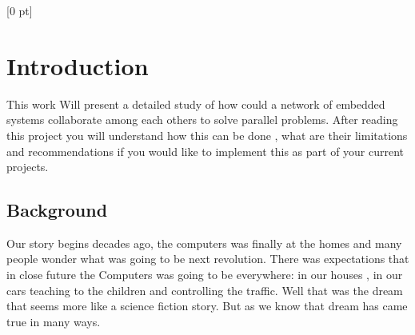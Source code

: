 
\titlespacing{\chapter}{0 pt}{30 pt}{50 pt}[0 pt]
\titleformat{\section}{\Large\bfseries}{\thesection}{0 pt}{\hspace{30 pt}}
\titleformat{\subsection}{\large\bfseries}{\thesubsection}{0 pt}{\hspace{30 pt}}
\pagestyle{fancy}
\fancyhead[LO,LE]{\footnotesize\textit{\leftmark}}
\fancyhead[RO,RE]{\thepage}
\fancyfoot[CO,CE]{}

\chapter{Introduction} %

\normalsize

This work Will present a detailed study of how could a network of embedded
systems collaborate among each others to solve parallel problems. After reading
this project you will understand how this can be done , what are their
limitations and recommendations if you would like to implement this as part of 
your current projects. 

\section{Background}
\vspace{30 pt}
\noindent

Our story begins decades ago, the computers was finally at the homes and many
people wonder what was going to be next revolution. There was expectations that
in close future the Computers was going to be everywhere: in our houses , in
our cars teaching to the children and controlling the traffic. Well that was
the dream that seems more like a science fiction story. But as we know that
dream has came true in many ways.

